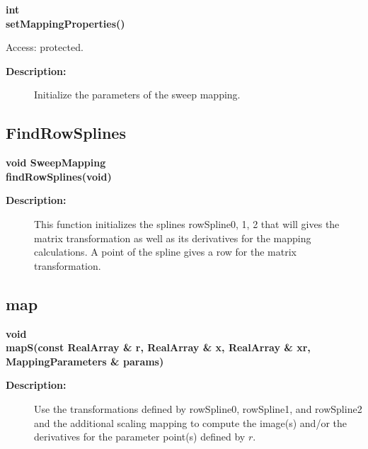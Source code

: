 \begin{flushleft} \textbf{%
int  \\ 
\settowidth{\SweepMappingIncludeArgIndent}{setMappingProperties(}%
setMappingProperties()
}\end{flushleft}
 Access: protected.
\begin{description}
\item[{\bf Description:}]  Initialize the parameters of the
  sweep mapping. 

\end{description}
\subsection{FindRowSplines}
 
\begin{flushleft} \textbf{%
void SweepMapping  \\ 
\settowidth{\SweepMappingIncludeArgIndent}{findRowSplines(}%
findRowSplines(void)
}\end{flushleft}
\begin{description}
\item[{\bf Description:}] 
 This function initializes the splines rowSpline0, 1, 2 that will
 gives the matrix transformation as well as its derivatives for
 the mapping calculations. A point of the spline gives
 a row for the matrix transformation. 
\end{description}
\subsection{map}
 
\begin{flushleft} \textbf{%
void  \\ 
\settowidth{\SweepMappingIncludeArgIndent}{mapS(}%
mapS(const RealArray \& r, RealArray \& x, RealArray \& xr, MappingParameters \& params)
}\end{flushleft}
\begin{description}
\item[{\bf Description:}]  Use the transformations defined by rowSpline0, 
 rowSpline1, and rowSpline2 and the additional scaling mapping 
 to compute the image(s) and/or the derivatives for the parameter
 point(s) defined by $r$.
\end{description}
